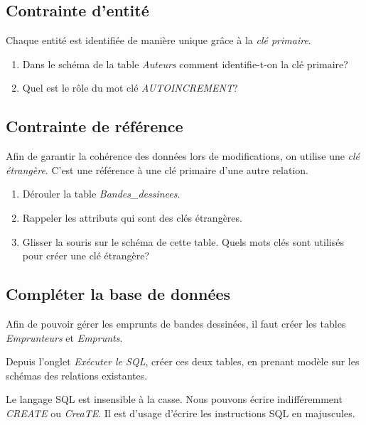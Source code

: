 \documentclass[a4paper,11pt]{article}
\begin{document}
\begin{Form}
\subsection{Contrainte d'entité}
Chaque entité est identifiée de manière unique grâce à la \emph{clé primaire}.
\begin{activite}
\begin{enumerate}
\item Dans le schéma de la table \emph{Auteurs} comment identifie-t-on la clé primaire?
\item Quel est le rôle du mot clé \emph{AUTOINCREMENT}?
\end{enumerate}
\end{activite}
\subsection{Contrainte de référence}
Afin de garantir la cohérence des données lors de modifications, on utilise une \emph{clé étrangère}. C'est une référence à une clé primaire d'une autre relation.
\begin{activite}
\begin{enumerate}
\item Dérouler la table \emph{Bandes\_dessinees}.
\item Rappeler les attributs qui sont des clés étrangères.
\item Glisser la souris sur le schéma de cette table. Quels mots clés sont utilisés pour créer une clé étrangère?
\end{enumerate}
\end{activite}
\subsection{Compléter la base de données}
Afin de pouvoir gérer les emprunts de bandes dessinées, il faut créer les tables \emph{Emprunteurs} et \emph{Emprunts}.
\begin{activite}
Depuis l'onglet \emph{Exécuter le SQL}, créer ces deux tables, en prenant modèle sur les schémas des relations existantes.
\end{activite}
\begin{aretenir}[Remarque]
Le langage SQL est insensible à la casse. Nous pouvons écrire indifféremment \emph{CREATE} ou \emph{CreaTE}. Il est d'usage d'écrire les instructions SQL en majuscules.
\end{aretenir}
\end{Form}
\end{document}
